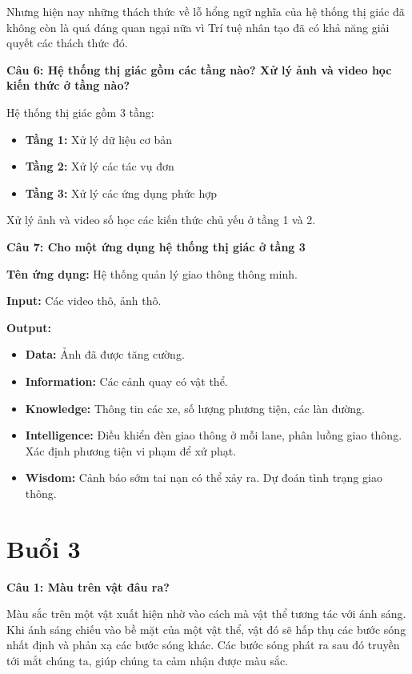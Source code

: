 Nhưng hiện nay những thách thức về lỗ hổng ngữ nghĩa của hệ thống thị giác đã không còn là quá đáng quan ngại nữa vì Trí tuệ nhân tạo đã có khả năng giải quyết các thách thức đó.

\textbf{Câu 6: Hệ thống thị giác gồm các tầng nào? Xử lý ảnh và video học kiến thức ở tầng nào?}

Hệ thống thị giác gồm 3 tầng:

\begin{itemize}
	\item \textbf{Tầng 1:} Xử lý dữ liệu cơ bản
	
	\item \textbf{Tầng 2:} Xử lý các tác vụ đơn
	
	\item \textbf{Tầng 3:} Xử lý các ứng dụng phức hợp
\end{itemize}

Xử lý ảnh và video số học các kiến thức chủ yếu ở tầng 1 và 2.

\textbf{Câu 7: Cho một ứng dụng hệ thống thị giác ở tầng 3}

\textbf{Tên ứng dụng:} Hệ thống quản lý giao thông thông minh.

\textbf{Input:} Các video thô, ảnh thô.

\textbf{Output:}

\begin{itemize}
	\item \textbf{Data:} Ảnh đã được tăng cường.
	
	\item \textbf{Information:} Các cảnh quay có vật thể.
	
	\item \textbf{Knowledge:} Thông tin các xe, số lượng phương tiện, các làn đường.
	
	\item \textbf{Intelligence:} Điều khiển đèn giao thông ở mỗi lane, phân luồng giao thông. Xác định phương tiện vi phạm để xử phạt.
	
	\item \textbf{Wisdom:} Cảnh báo sớm tai nạn có thể xảy ra. Dự đoán tình trạng giao thông.
\end{itemize}

\section{Buổi 3}

\textbf{Câu 1: Màu trên vật đâu ra?}

Màu sắc trên một vật xuất hiện nhờ vào cách mà vật thể tương tác với ánh sáng. Khi ánh sáng chiếu vào bề mặt của một vật thể, vật đó sẽ hấp thụ các bước sóng nhất định và phản xạ các bước sóng khác. Các bước sóng phát ra sau đó truyền tới mắt chúng ta, giúp chúng ta cảm nhận được màu sắc.

